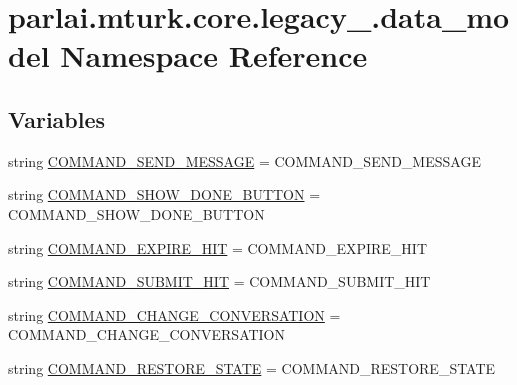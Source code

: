 \hypertarget{namespaceparlai_1_1mturk_1_1core_1_1legacy__2018_1_1data__model}{}\section{parlai.\+mturk.\+core.\+legacy\+\_.\+data\+\_\+model Namespace Reference}
\label{namespaceparlai_1_1mturk_1_1core_1_1legacy__2018_1_1data__model}
\subsection*{Variables}
\begin{DoxyCompactItemize}
\item 
string \hyperlink{namespaceparlai_1_1mturk_1_1core_1_1legacy__2018_1_1data__model_a2039b21d6ed2bd9bf42ae57f9dae1b19}{C\+O\+M\+M\+A\+N\+D\+\_\+\+S\+E\+N\+D\+\_\+\+M\+E\+S\+S\+A\+GE} = \textquotesingle{}C\+O\+M\+M\+A\+N\+D\+\_\+\+S\+E\+N\+D\+\_\+\+M\+E\+S\+S\+A\+GE\textquotesingle{}
\item 
string \hyperlink{namespaceparlai_1_1mturk_1_1core_1_1legacy__2018_1_1data__model_a9e637a4a28ac0f946ba0aeb517b2591e}{C\+O\+M\+M\+A\+N\+D\+\_\+\+S\+H\+O\+W\+\_\+\+D\+O\+N\+E\+\_\+\+B\+U\+T\+T\+ON} = \textquotesingle{}C\+O\+M\+M\+A\+N\+D\+\_\+\+S\+H\+O\+W\+\_\+\+D\+O\+N\+E\+\_\+\+B\+U\+T\+T\+ON\textquotesingle{}
\item 
string \hyperlink{namespaceparlai_1_1mturk_1_1core_1_1legacy__2018_1_1data__model_a1d50afc71f8014f2634970a146a5789f}{C\+O\+M\+M\+A\+N\+D\+\_\+\+E\+X\+P\+I\+R\+E\+\_\+\+H\+IT} = \textquotesingle{}C\+O\+M\+M\+A\+N\+D\+\_\+\+E\+X\+P\+I\+R\+E\+\_\+\+H\+IT\textquotesingle{}
\item 
string \hyperlink{namespaceparlai_1_1mturk_1_1core_1_1legacy__2018_1_1data__model_a695337b0fdfa81b81555d3678df2de63}{C\+O\+M\+M\+A\+N\+D\+\_\+\+S\+U\+B\+M\+I\+T\+\_\+\+H\+IT} = \textquotesingle{}C\+O\+M\+M\+A\+N\+D\+\_\+\+S\+U\+B\+M\+I\+T\+\_\+\+H\+IT\textquotesingle{}
\item 
string \hyperlink{namespaceparlai_1_1mturk_1_1core_1_1legacy__2018_1_1data__model_a98858e256dd26c14e5853e7dfb4d213f}{C\+O\+M\+M\+A\+N\+D\+\_\+\+C\+H\+A\+N\+G\+E\+\_\+\+C\+O\+N\+V\+E\+R\+S\+A\+T\+I\+ON} = \textquotesingle{}C\+O\+M\+M\+A\+N\+D\+\_\+\+C\+H\+A\+N\+G\+E\+\_\+\+C\+O\+N\+V\+E\+R\+S\+A\+T\+I\+ON\textquotesingle{}
\item 
string \hyperlink{namespaceparlai_1_1mturk_1_1core_1_1legacy__2018_1_1data__model_aa29dbc9f515ebb3f7186aa5c99642012}{C\+O\+M\+M\+A\+N\+D\+\_\+\+R\+E\+S\+T\+O\+R\+E\+\_\+\+S\+T\+A\+TE} = \textquotesingle{}C\+O\+M\+M\+A\+N\+D\+\_\+\+R\+E\+S\+T\+O\+R\+E\+\_\+\+S\+T\+A\+TE\textquotesingle{}

\end{DoxyCompactItemize}
